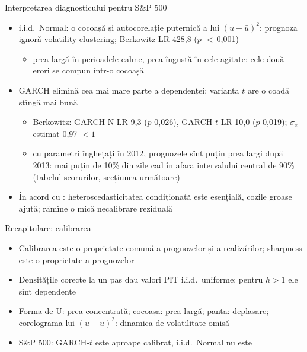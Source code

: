 \begin{frame}{Interpretarea diagnosticului pentru S\&P 500}
\itemsize{\small}
\begin{itemize}
    \item i.i.d.\ Normal: o cocoașă și autocorelație puternică a lui $(u - \bar u)^2$: prognoza ignoră volatility clustering; Berkowitz LR 428{,}8 ($p$ $<$\,0{,}001)
    \begin{itemize}
        \item prea largă în perioadele calme, prea îngustă în cele agitate: cele două erori se compun într-o cocoașă
    \end{itemize}
    \item GARCH elimină cea mai mare parte a dependenței; varianta $t$ are o coadă stîngă mai bună
    \begin{itemize}
        \item Berkowitz: GARCH-N LR 9{,}3 ($p$ 0{,}026), GARCH-$t$ LR 10{,}0 ($p$ 0{,}019); $\sigma_z$ estimat 0{,}97 $< 1$
        \item cu parametri înghețați în 2012, prognozele sînt puțin prea largi după 2013: mai puțin de 10\% din zile cad în afara intervalului central de 90\% (tabelul scorurilor, secțiunea următoare)
    \end{itemize}
    \item În acord cu : heteroscedasticitatea condiționată este esențială, cozile groase ajută; rămîne o mică necalibrare reziduală
\end{itemize}
\end{frame}

\begin{frame}{Recapitulare: calibrarea}
\itemsize{\small}
\begin{itemize}
    \item Calibrarea este o proprietate comună a prognozelor și a realizărilor; sharpness este o proprietate a prognozelor
    \item Densitățile corecte la un pas dau valori PIT i.i.d.\ uniforme; pentru $h > 1$ ele sînt dependente
    \item Forma de U: prea concentrată; cocoașa: prea largă; panta: deplasare; corelograma lui $(u - \bar u)^2$: dinamica de volatilitate omisă
    \item S\&P 500: GARCH-$t$ este aproape calibrat, i.i.d.\ Normal nu este
\end{itemize}
\end{frame}


